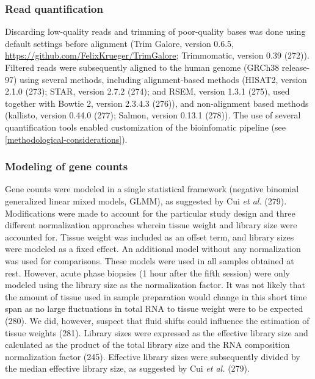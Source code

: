 \documentclass[twoside,10pt]{gihclass} %
\begin{document}
\hypertarget{read-quantification}{%
\subsubsection{Read quantification}\label{read-quantification}}

Discarding low-quality reads and trimming of poor-quality bases was done using default settings before alignment (Trim Galore, version 0.6.5, \url{https://github.com/FelixKrueger/TrimGalore}; Trimmomatic, version 0.39 (272)). Filtered reads were subsequently aligned to the human genome (GRCh38 release-97) using several methods, including alignment-based methods
(HISAT2, version 2.1.0 (273); STAR, version 2.7.2 (274); and
RSEM, version 1.3.1 (275),
used together with Bowtie 2, version 2.3.4.3 (276)),
and non-alignment based methods (kallisto, version 0.44.0 (277);
Salmon, version 0.13.1 (278)).
The use of several quantification tools enabled customization of the bioinfomatic pipeline (see \ref{methodological-considerations}).

\hypertarget{modeling-of-gene-counts}{%
\subsubsection{Modeling of gene counts}\label{modeling-of-gene-counts}}

Gene counts were modeled in a single statistical framework (negative binomial generalized linear mixed models, GLMM), as suggested by Cui \emph{et al.} (279).
Modifications were made to account for the particular study design and three different normalization approaches wherein tissue weight and library size were accounted for. Tissue weight was included as an offset term, and library sizes were modeled as a fixed effect.
An additional model without any normalization was used for comparisons.
These models were used in all samples obtained at rest. However, acute phase biopsies (1 hour after the fifth session) were only modeled using the library size as the normalization factor. It was not likely that the amount of tissue used in sample preparation would change in this short time span as no large fluctuations in total RNA to tissue weight were to be expected
(280).
We did, however, suspect that fluid shifts could influence the estimation of tissue weights
(281).
Library sizes were expressed as the effective library size and calculated as the product of the total library size and the RNA composition normalization factor
(245).
Effective library sizes were subsequently divided by the median effective library size, as suggested by Cui \emph{et al.}
(279).
\end{document}
